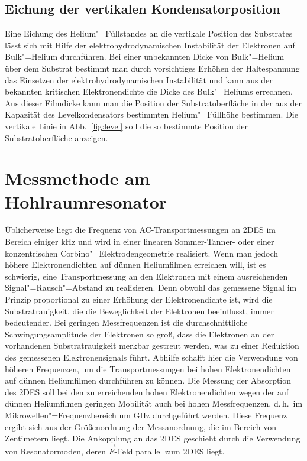 \subsection{Eichung der vertikalen Kondensatorposition}
\label{ssec:level_calib}

Eine Eichung des Helium"=Füllstandes an die vertikale Position des Substrates lässt sich mit Hilfe der elektrohydrodynamischen Instabilität der Elektronen auf Bulk"=Helium durchführen. Bei einer unbekannten Dicke von Bulk"=Helium über dem Substrat bestimmt man durch vorsichtiges Erhöhen der Haltespannung das Einsetzen der elektrohydrodynamischen Instabilität und kann aus der bekannten kritischen Elektronendichte die Dicke des Bulk"=Heliums errechnen. Aus dieser Filmdicke kann man die Position der Substratoberfläche in der aus der Kapazität des Levelkondensators bestimmten Helium"=Füllhöhe bestimmen. Die vertikale Linie in Abb.~\ref{fig:level} soll die so bestimmte Position der Substratoberfläche anzeigen.

\section{Messmethode am Hohlraumresonator}
Üblicherweise liegt die Frequenz von AC-Transportmessungen an 2DES im Bereich
einiger kHz und wird in einer linearen Sommer-Tanner- \cite{Som71} oder einer konzentrischen Corbino"=Elektrodengeometrie realisiert. Wenn man jedoch höhere
Elektronendichten auf dünnen Heliumfilmen erreichen will, ist es schwierig,
eine Transportmessung an den Elektronen mit einem ausreichenden Signal"=Rausch"=Abstand zu realisieren. Denn obwohl das gemessene Signal im Prinzip proportional zu einer Erhöhung der Elektronendichte ist, wird die Substratrauigkeit, die die Beweglichkeit der Elektronen beeinflusst, immer bedeutender. Bei geringen Messfrequenzen ist die durchschnittliche Schwingungsamplitude der Elektronen so groß, dass die Elektronen an der vorhandenen Substratrauigkeit merkbar gestreut werden, was zu einer Reduktion des gemessenen Elektronensignals führt. Abhilfe schafft hier die Verwendung von höheren Frequenzen, um die Transportmessungen bei hohen Elektronendichten auf dünnen Heliumfilmen durchführen zu können. Die Messung der Absorption des 2DES soll bei den zu erreichenden hohen Elektronendichten wegen der auf dünnen Heliumfilmen geringen Mobilität auch bei hohen Messfrequenzen, d.\,h.\ im Mikrowellen"=Frequenzbereich um \unit[10]{GHz} durchgeführt werden. Diese Frequenz ergibt sich aus der Größenordnung der Messanordnung, die im Bereich von Zentimetern liegt. Die Ankopplung an das 2DES geschieht durch die Verwendung von Resonatormoden, deren $\vec E$-Feld parallel zum 2DES liegt.

